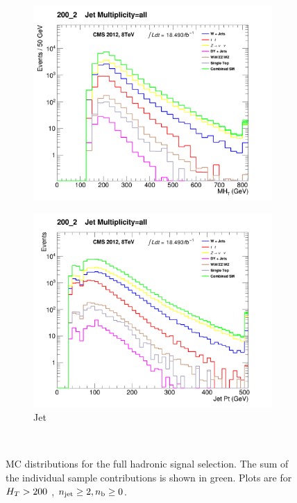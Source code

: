 \begin{figure}[!ht]
    \begin{subfigure}[b]{0.48\textwidth}
      \includegraphics[width=\textwidth]{Figs/datamc/had/v1/MHT_all_200_upwards}
      \caption{\mht}
    \end{subfigure}
    \begin{subfigure}[b]{0.48\textwidth}
      \includegraphics[width=\textwidth]{Figs/datamc/had/v1/CommonJetPt_all_200_upwards}
      \caption{Jet \Pt}
    \end{subfigure} \\
    \caption{\label{fig:datamc_had_inc}
    MC distributions for the full hadronic signal selection. The 
    sum of the individual sample contributions is shown in green. Plots
    are for $H_T>200$ \gev, $n_{\text{jet}}\geq2, n_{\text{b}}\geq0$.
    }
\end{figure}
  
